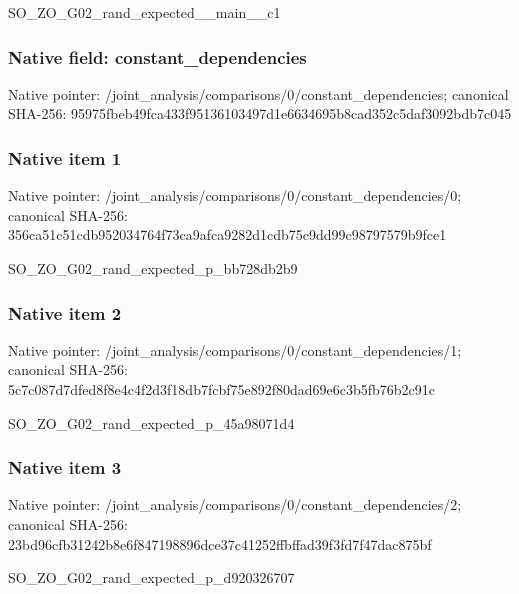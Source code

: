 \documentclass[10pt,a4paper]{article}
\begin{document}
\begingroup\raggedright\sloppy SO\_\allowbreak{}ZO\_\allowbreak{}G02\_\allowbreak{}rand\_\allowbreak{}expected\_\allowbreak{}\_\allowbreak{}main\_\allowbreak{}\_\allowbreak{}c1\par\endgroup

\subsubsection{Native field: constant\_\allowbreak{}dependencies}
Native pointer: /joint\_\allowbreak{}analysis/comparisons/0/constant\_\allowbreak{}dependencies; canonical SHA-256: 95975fbeb49fca433f95136103497d1e6634695b8cad352c5daf3092bdb7c045

\subsubsection{Native item 1}
Native pointer: /joint\_\allowbreak{}analysis/comparisons/0/constant\_\allowbreak{}dependencies/0; canonical SHA-256: 356ca51c51cdb952034764f73ca9afca9282d1cdb75c9dd99c98797579b9fce1

\begingroup\raggedright\sloppy SO\_\allowbreak{}ZO\_\allowbreak{}G02\_\allowbreak{}rand\_\allowbreak{}expected\_\allowbreak{}p\_\allowbreak{}bb728db2b9\par\endgroup

\subsubsection{Native item 2}
Native pointer: /joint\_\allowbreak{}analysis/comparisons/0/constant\_\allowbreak{}dependencies/1; canonical SHA-256: 5c7c087d7dfed8f8e4c4f2d3f18db7fcbf75e892f80dad69e6c3b5fb76b2c91c

\begingroup\raggedright\sloppy SO\_\allowbreak{}ZO\_\allowbreak{}G02\_\allowbreak{}rand\_\allowbreak{}expected\_\allowbreak{}p\_\allowbreak{}45a98071d4\par\endgroup

\subsubsection{Native item 3}
Native pointer: /joint\_\allowbreak{}analysis/comparisons/0/constant\_\allowbreak{}dependencies/2; canonical SHA-256: 23bd96cfb31242b8e6f847198896dce37c41252ffbffad39f3fd7f47dac875bf

\begingroup\raggedright\sloppy SO\_\allowbreak{}ZO\_\allowbreak{}G02\_\allowbreak{}rand\_\allowbreak{}expected\_\allowbreak{}p\_\allowbreak{}d920326707\par\endgroup
\end{document}
